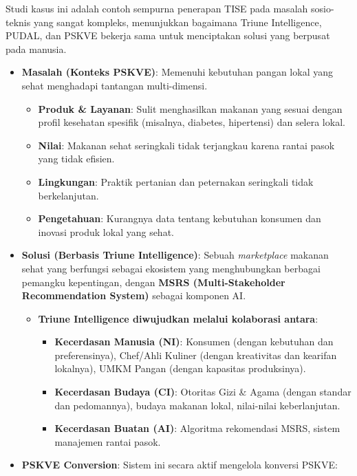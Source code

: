 \documentclass[
  letterpaper,
  DIV=11,
  numbers=noendperiod]{scrreprt}
\providecommand{\tightlist}{%
  \setlength{\itemsep}{0pt}\setlength{\parskip}{0pt}}
\begin{document}
Studi kasus ini adalah contoh sempurna penerapan TISE pada masalah
sosio-teknis yang sangat kompleks, menunjukkan bagaimana Triune
Intelligence, PUDAL, dan PSKVE bekerja sama untuk menciptakan solusi
yang berpusat pada manusia.

\begin{itemize}
\tightlist
\item
  \textbf{Masalah (Konteks PSKVE)}: Memenuhi kebutuhan pangan lokal yang
  sehat menghadapi tantangan multi-dimensi.

  \begin{itemize}
  \tightlist
  \item
    \textbf{Produk \& Layanan}: Sulit menghasilkan makanan yang sesuai
    dengan profil kesehatan spesifik (misalnya, diabetes, hipertensi)
    dan selera lokal.
  \item
    \textbf{Nilai}: Makanan sehat seringkali tidak terjangkau karena
    rantai pasok yang tidak efisien.
  \item
    \textbf{Lingkungan}: Praktik pertanian dan peternakan seringkali
    tidak berkelanjutan.
  \item
    \textbf{Pengetahuan}: Kurangnya data tentang kebutuhan konsumen dan
    inovasi produk lokal yang sehat.
  \end{itemize}
\item
  \textbf{Solusi (Berbasis Triune Intelligence)}: Sebuah
  \emph{marketplace} makanan sehat yang berfungsi sebagai ekosistem yang
  menghubungkan berbagai pemangku kepentingan, dengan \textbf{MSRS
  (Multi-Stakeholder Recommendation System)} sebagai komponen AI.

  \begin{itemize}
  \tightlist
  \item
    \textbf{Triune Intelligence diwujudkan melalui kolaborasi antara}:

    \begin{itemize}
    \tightlist
    \item
      \textbf{Kecerdasan Manusia (NI)}: Konsumen (dengan kebutuhan dan
      preferensinya), Chef/Ahli Kuliner (dengan kreativitas dan kearifan
      lokalnya), UMKM Pangan (dengan kapasitas produksinya).
    \item
      \textbf{Kecerdasan Budaya (CI)}: Otoritas Gizi \& Agama (dengan
      standar dan pedomannya), budaya makanan lokal, nilai-nilai
      keberlanjutan.
    \item
      \textbf{Kecerdasan Buatan (AI)}: Algoritma rekomendasi MSRS,
      sistem manajemen rantai pasok.
    \end{itemize}
  \end{itemize}
\item
  \textbf{PSKVE Conversion}: Sistem ini secara aktif mengelola konversi
  PSKVE:


\end{itemize}
\end{document}
